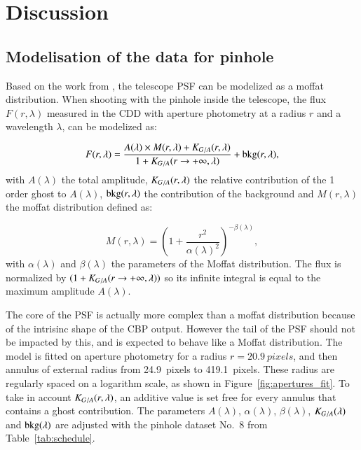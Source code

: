 \section{Discussion}
\label{sec:discussion}

\subsection{Modelisation of the \SD data for \spinhole pinhole}

Based on the work from \cite{moffat}, the \SD telescope PSF can be modelized as a moffat distribution. When shooting with the \spinhole pinhole inside the \SD telescope, the flux $F(r, \lambda)$ measured in the CDD with aperture photometry at a radius $r$ and a wavelength $\lambda$, can be modelized as: 

\begin{equation}
F(r, \lambda) = \frac{A(\lambda) \times M(r, \lambda) + K_{G/A}(r, \lambda)}{1 + K_{G/A}(r \rightarrow +\infty, \lambda)} + \mathrm{bkg}(r, \lambda),
\label{eq:moffat_model}
\end{equation}
with $A(\lambda)$ the total amplitude, $K_{G/A}(r, \lambda)$ the relative contribution of the 1 order ghost to $A(\lambda)$, $\mathrm{bkg}(r, \lambda)$ the contribution of the background and $M(r, \lambda)$ the moffat distribution defined as:

\begin{equation}
M(r, \lambda)= \left( 1+\frac{r^2}{\alpha(\lambda)^2} \right)^{-\beta(\lambda)},
\end{equation}
with $\alpha(\lambda)$ and $\beta(\lambda)$ the parameters of the Moffat distribution. The flux is normalized by $(1 + K_{G/A}(r \rightarrow +\infty, \lambda))$ so its infinite integral is equal to the maximum amplitude $A(\lambda)$. 

The core of the PSF is actually more complex than a moffat distribution because of the intrisinc shape of the CBP output. However the tail of the PSF should not be impacted by this, and is expected to behave like a Moffat distribution. 
The model is fitted on aperture photometry for a radius $r=\SI{20.9}{pixels}$, and then annulus of external radius from \SI{24.9}{pixels} to \SI{419.1}{pixels}. These radius are regularly spaced on a logarithm scale, as shown in Figure~\ref{fig:apertures_fit}. To take in account $K_{G/A}(r, \lambda)$, an additive value is set free for every annulus that contains a ghost contribution. The parameters $A(\lambda)$, $\alpha(\lambda)$, $\beta(\lambda)$, $K_{G/A}(\lambda)$ and $\mathrm{bkg}(\lambda)$ are adjusted with the \spinhole pinhole dataset No.~8 from Table~\ref{tab:schedule}. 

